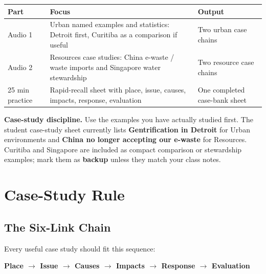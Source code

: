 \documentclass[11pt,a4paper]{article}
\newcommand{\term}[1]{\textcolor{HeadingBlue}{\textbf{#1}}}
\newcommand{\boxnote}[3]{%
\noindent\colorbox{#1}{%
  \begin{minipage}{0.965\textwidth}
  \sffamily
  \textbf{\textcolor{HeadingBlue}{#2}} #3
  \end{minipage}
}}
\begin{document}
\begin{tabularx}{\textwidth}{L{0.18\textwidth}Y L{0.28\textwidth}}
\toprule
\textbf{Part} & \textbf{Focus} & \textbf{Output} \\
\midrule
Audio 1 & Urban named examples and statistics: Detroit first, Curitiba as a
comparison if useful & Two urban case chains \\
Audio 2 & Resources case studies: China e-waste / waste imports and Singapore
water stewardship & Two resource case chains \\
25 min practice & Rapid-recall sheet with place, issue, causes, impacts,
response, evaluation & One completed case-bank sheet \\
\bottomrule
\end{tabularx}

\boxnote{SoftTint}{Case-study discipline.}{Use the examples you have actually
studied first. The student case-study sheet currently lists
\term{Gentrification in Detroit} for Urban environments and \term{China no
longer accepting our e-waste} for Resources. Curitiba and Singapore are
included as compact comparison or stewardship examples; mark them as
\term{backup} unless they match your class notes.}

\section{Case-Study Rule}

\subsection{The Six-Link Chain}

Every useful case study should fit this sequence:

\begin{center}
{\sffamily\bfseries\color{HeadingBlue}
Place $\rightarrow$ Issue $\rightarrow$ Causes $\rightarrow$ Impacts
$\rightarrow$ Response $\rightarrow$ Evaluation}
\end{center}
\end{document}
